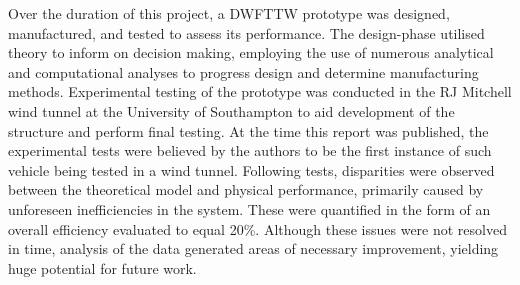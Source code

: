 

Over the duration of this project, a DWFTTW prototype was designed, manufactured, and tested to assess its performance. The design-phase utilised theory to inform on decision making, employing the use of numerous analytical and computational analyses to progress design and determine manufacturing methods. Experimental testing of the prototype was conducted in the RJ Mitchell wind tunnel at the University of Southampton to aid development of the structure and perform final testing. At the time this report was published, the experimental tests were believed by the authors to be the first instance of such vehicle being tested in a wind tunnel. Following tests, disparities were observed between the theoretical model and physical performance, primarily caused by unforeseen inefficiencies in the system. These were quantified in the form of an overall efficiency evaluated to equal 20\%. Although these issues were not resolved in time, analysis of the data generated areas of necessary improvement, yielding huge potential for future work.

